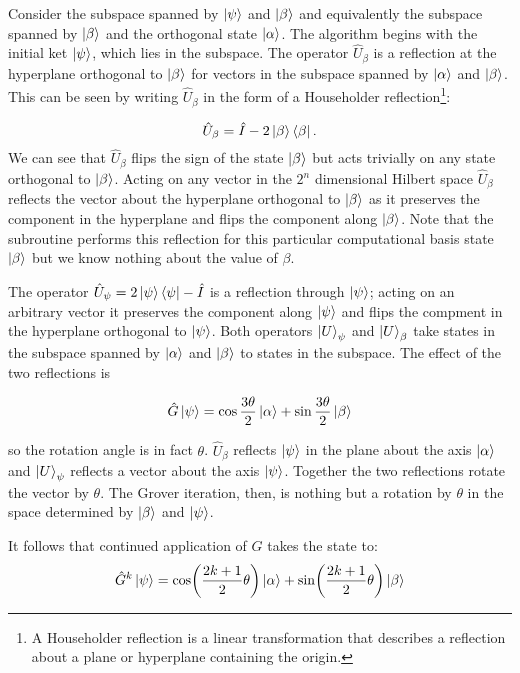 Consider the subspace spanned by $\ket{\psi}$ and $\ket{\beta}$ and equivalently the subspace spanned by $\ket{\beta}$ and the orthogonal state $\ket{\alpha}$.
The algorithm begins with the initial ket $\ket{\psi}$, which lies in the subspace. The operator $\hat{U}_\beta$ is a reflection at the hyperplane orthogonal to $\ket{\beta}$ for vectors in the subspace spanned by $\ket{\alpha}$ and $\ket{\beta}$. This can be seen by writing $\hat{U}_\beta$ in the form of a Householder reflection\footnote{A Householder reflection is a linear transformation that describes a reflection about a plane or hyperplane containing the origin.}:

\begin{equation}\label{eq:beta-projection}
    \hat{U}_\beta = \hat{I} - 2 \ket{\beta}\bra{\beta}.
\end{equation}
We can see that $\hat{U}_\beta$ flips the sign of the state $\ket{\beta}$ but acts trivially on any state orthogonal to $\ket{\beta}$. Acting on any vector in the $2^n$ dimensional Hilbert space $\hat{U}_\beta$  reflects the vector about the hyperplane orthogonal to $\ket{\beta}$ as it preserves the component in the hyperplane and flips the component along $\ket{\beta}$. Note that the subroutine performs this reflection for this particular computational basis state $\ket{\beta}$ but we know nothing about the value of $\beta$.

 The operator $\hat{U}_\psi = 2 \ket{\psi}\bra{\psi} - \hat{I}$ is a reflection through $\ket{\psi}$; acting on an arbitrary vector it preserves the component along $\ket{\psi}$ and flips the compment in the hyperplane orthogonal to $\ket{\psi}$. Both operators $\ket{U}_\psi$ and $\ket{U}_\beta$ take states in the subspace spanned by $\ket{\alpha}$ and $\ket{\beta}$ to states in the subspace. The effect of the two reflections is
 
 \begin{equation*}
    \hat{G}\ket{\psi} = \cos\frac{3\theta}{2} \ket{\alpha} + \sin\frac{3\theta}{2} \ket{\beta}
\end{equation*}

so the rotation angle is in fact $\theta$. $\hat{U}_\beta$ reflects $\ket{\psi}$ in the plane about the axis $\ket{\alpha}$ and $\ket{U}_\psi$ reflects a vector about the axis $\ket{\psi}$. Together the two reflections rotate the vector by $\theta$. The Grover iteration, then, is nothing but a rotation by $\theta$ in the space determined by $\ket{\beta}$ and $\ket{\psi}$.

It follows that continued application of $G$ takes the state to:
\begin{equation*}
    \hat{G}^{k}\ket{\psi} = \cos\biggl(\frac{2k+1}{2}\theta\biggr) \ket{\alpha} + \sin\biggl(\frac{2k+1}{2}\theta\biggr) \ket{\beta}
\end{equation*}

